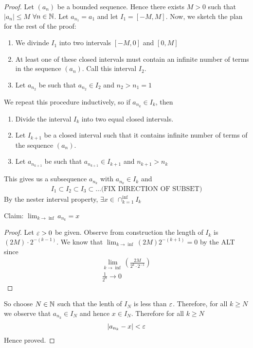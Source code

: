 \begin{proof}
	Let $\left( a_n \right) $ be a bounded sequence. Hence there exists $M > 0$ such that $\left|a_n\right| \le M$  $\forall n \in \mathbb{N}$. Let $a_{n_{1}} = a_1$ and let $I_1 = [-M, M]$. Now, we sketch the plan for the rest of the proof:
	 \begin{enumerate}
		\item We divinde $I_1$ into two intervals $[-M, 0]$ and $[0, M]$
		\item At least one of these closed intervals must contain an infinite number of terms in the sequence  $\left( a_n \right) $. Call this interval $I_2$.
		\item Let $a_{n_{2}}$ be such that $a_{n_{2}} \in I_2$ and $n_2 > n_1 = 1$
	\end{enumerate}

	We repeat this procedure inductively, so if $a_{n_{k}} \in I_k$, then

	\begin{enumerate}
		\item Divide the interval $I_k$ into two equal closed intervals.
		\item Let $I_{k+1}$ be a closed interval such that it contains infinite number of terms of the sequence $\left( a_n \right) $.
		\item Let $a_{n_{k+1}}$ be such that $a_{n_{k+1}} \in I_{k+1}$ and $n_{k+1} > n_k$
	\end{enumerate}
	This gives us a subsequence $a_{n_{k}}$ with $a_{n_{k}} \in I_k$ and 
	\begin{align}
		I_1 \subset I_2 \subset I_3 \subset \ldots \text{(FIX DIRECTION OF SUBSET)} 
	\end{align}
	By the nester interval property, $\exists x \in \cap_{k=1}^{\inf } I_k$

	Claim: $\lim_{k \to \inf } a_{n_{k}} = x$
	\begin{proof}
		Let $\e > 0$ be given. Observe from construction the length of $I_k$ is $\left( 2M \right) \cdot 2^{-\left( k-1 \right) }$. We know that $\lim_{k \to \inf } \left( 2M \right) 2^{-\left( k+1 \right) } = 0$ by the ALT since 
		\begin{align}
			\lim_{k \to \inf } \left( \frac{2M}{2^{k} \cdot 2^{-1}} \right) \\
			\frac{1}{2^{n}} \to 0
		\end{align}
	\end{proof}

	So choose $N \in \mathbb{N}$ such that the lenth of $I_N$ is less than $\e$. Therefore, for all $k \ge N$ we observe that $a_{n_{k}} \in I_{N}$ and hence $x \in I_{N}$. Therefore for all $k \ge N$
	\begin{align}
		\left|a_{n_{k}} - x\right| < \e
	\end{align}
	Hence proved.
\end{proof}



